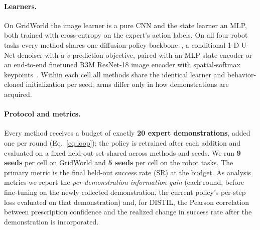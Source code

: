 \documentclass[letterpaper]{article} %
\begin{document}
\paragraph{Learners.}
On GridWorld the image learner is a pure CNN and the state learner an MLP,
both trained with cross-entropy on the expert's action labels. On all four
robot tasks every method shares one diffusion-policy
backbone~\citep{chi2023diffusionpolicy,ho2020ddpm}, a conditional 1-D U-Net
denoiser with a $v$-prediction objective, paired with an MLP state encoder or an
end-to-end finetuned R3M ResNet-18 image encoder with spatial-softmax
keypoints~\citep{nair2022r3m}. Within each cell all methods share the
identical learner and behavior-cloned initialization per seed; arms differ
only in how demonstrations are acquired.

\paragraph{Protocol and metrics.}
Every method receives a budget of exactly \textbf{20 expert demonstrations},
added one per round (Eq.~\ref{eq:loop}); the policy is retrained after each
addition and evaluated on a fixed held-out set shared across methods and
seeds. We run \textbf{9 seeds} per cell on GridWorld and \textbf{5 seeds} per
cell on the robot tasks. The primary metric is the final held-out success
rate (SR) at the budget. As analysis metrics we report the
\emph{per-demonstration information gain} (each round, before fine-tuning on
the newly collected demonstration, the current policy's per-step loss
evaluated on that demonstration) and, for DISTIL, the Pearson correlation
between prescription confidence and the realized change in success rate
after the demonstration is incorporated.
\end{document}
